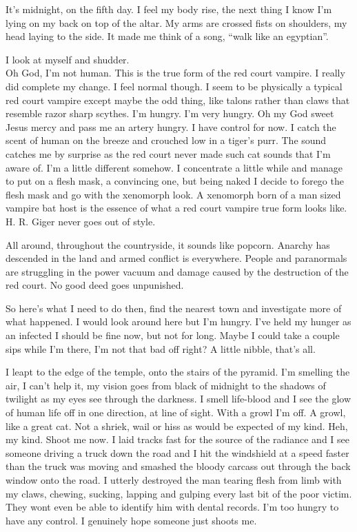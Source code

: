 It's midnight, on the fifth day. I feel my body rise, the next thing I know I'm lying on my back on top of the altar. My arms are crossed fists on shoulders, my head laying to the side. It made me think of a song, ``walk like an egyptian''.

\parasep

I look at myself and shudder.\\

Oh God, I'm not human. This is the true form of the red court vampire. I really did complete my change. I feel normal though. I seem to be physically a typical red court vampire except maybe the odd thing, like talons rather than claws that resemble razor sharp scythes. I'm hungry. I'm very hungry. Oh my God sweet Jesus mercy and pass me an artery hungry. I have control for now. I catch the scent of human on the breeze and crouched low in a tiger's purr. The sound catches me by surprise as the red court never made such cat sounds that I'm aware of. I'm a little different somehow. I concentrate a little while and manage to put on a flesh mask, a convincing one, but being naked I decide to forego the flesh mask and go with the xenomorph look. A xenomorph born of a man sized vampire bat host is the essence of what a red court vampire true form looks like. H. R. Giger never goes out of style. 

All around, throughout the countryside, it sounds like popcorn. Anarchy has descended in the land and armed conflict is everywhere. People and paranormals are struggling in the power vacuum and damage caused by the destruction of the red court. No good deed goes unpunished.

So here's what I need to do then, find the nearest town and investigate more of what happened. I would look around here but I'm hungry. I've held my hunger as an infected I should be fine now, but not for long. Maybe I could take a couple sips while I'm there, I'm not that bad off right? A little nibble, that's all.

I leapt to the edge of the temple, onto the stairs of the pyramid. I'm smelling the air, I can't help it, my vision goes from black of midnight to the shadows of twilight as my eyes see through the darkness. I smell life-blood and I see the glow of human life off in one direction, at line of sight. With a growl I'm off. A growl, like a great cat. Not a shriek, wail or hiss as would be expected of my kind. Heh, my kind. Shoot me now. I laid tracks fast for the source of the radiance and I see someone driving a truck down the road and I hit the windshield at a speed faster than the truck was moving and smashed the bloody carcass out through the back window onto the road. I utterly destroyed the man tearing flesh from limb with my claws, chewing, sucking, lapping and gulping every last bit of the poor victim. They wont even be able to identify him with dental records. I'm too hungry to have any control. I genuinely hope someone just shoots me.

